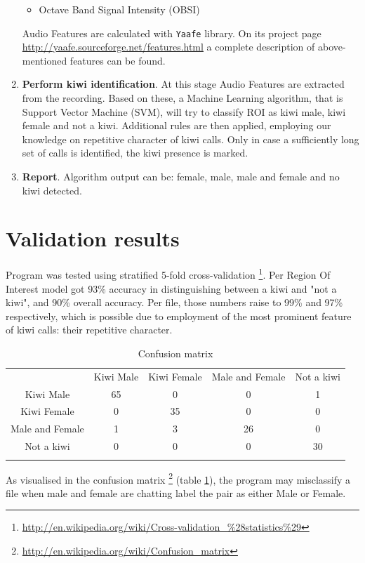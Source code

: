 \documentclass[paper=a4, fontsize=11pt]{scrartcl}	%
\numberwithin{equation}{section}		%
\numberwithin{figure}{section}			%
\numberwithin{table}{section}				%
\begin{document}
\begin{enumerate}
\begin{itemize}
		\item Octave Band Signal Intensity (OBSI)
	\end{itemize}
	Audio Features are calculated with \texttt{Yaafe} library. On its project page \url{http://yaafe.sourceforge.net/features.html} a complete description of above-mentioned features can be found.
	\item \textbf{Perform kiwi identification}. At this stage Audio Features are extracted from the recording. Based on these, a Machine Learning algorithm, that is Support Vector Machine (SVM), will try to classify ROI as kiwi male, kiwi female and not a kiwi. Additional rules are then applied, employing our knowledge on repetitive character of kiwi calls. Only in case a sufficiently long set of calls is identified, the kiwi presence is marked. 
	\item \textbf{Report}. Algorithm output can be: female, male, male and female and no kiwi detected.
\end{enumerate}

\section{Validation results}
Program was tested using stratified 5-fold cross-validation \footnote{\url{http://en.wikipedia.org/wiki/Cross-validation_\%28statistics\%29}}. Per Region Of Interest model got 93\% accuracy in distinguishing between a kiwi and "not a kiwi", and 90\% overall accuracy. Per file, those numbers raise to 99\% and 97\% respectively, which is possible due to employment of the most prominent feature of kiwi calls: their repetitive character. 

\begin{table}[hp]
\label{tab:confusion}
\caption{Confusion matrix}
\begin{tabularx}{.7\textwidth}{c|c c c c |}
 & Kiwi Male & Kiwi Female & Male and Female & \multicolumn{1}{c}{Not a kiwi} \\
\hhline{-----}
Kiwi Male & 65 \cellcolor[gray]{.8}& 0 & 0 & 1 \\
Kiwi Female & 0 & 35 \cellcolor[gray]{.8}& 0 & 0 \\
Male and Female & 1 & 3 & 26 \cellcolor[gray]{.8} & 0 \\
Not a kiwi & 0 & 0 & 0 & 30 \cellcolor[gray]{.8} \\
\hhline{~----}
\end{tabularx}
\end{table}

As visualised in the confusion matrix \footnote{\url{http://en.wikipedia.org/wiki/Confusion_matrix}} (table \ref{tab:confusion}), the program may misclassify a file when male and female are chatting label the pair as either Male or Female.
\end{document}

